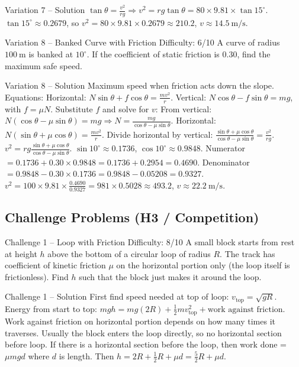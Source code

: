 \documentclass[11pt]{beamer}
\begin{document}
\begin{frame}{Variation 7 – Solution}
$\tan\theta = \frac{v^2}{rg} \Rightarrow v^2 = rg\tan\theta = 80\times9.81\times\tan15^\circ$.
$\tan15^\circ \approx 0.2679$, so $v^2 = 80\times9.81\times0.2679 \approx 210.2$, $v \approx 14.5\ \mathrm{m/s}$.
\end{frame}

\begin{frame}[shrink=15]{Variation 8 – Banked Curve with Friction \hfill Difficulty: 6/10}
A curve of radius $100\ \mathrm{m}$ is banked at $10^\circ$. If the coefficient of static friction is $0.30$, find the maximum safe speed.
\end{frame}

\begin{frame}[shrink=15]{Variation 8 – Solution}
Maximum speed when friction acts down the slope. Equations:
Horizontal: $N\sin\theta + f\cos\theta = \frac{mv^2}{r}$.
Vertical: $N\cos\theta - f\sin\theta = mg$, with $f = \mu N$.
Substitute $f$ and solve for $v$:
From vertical: $N(\cos\theta - \mu\sin\theta) = mg \Rightarrow N = \frac{mg}{\cos\theta - \mu\sin\theta}$.
Horizontal: $N(\sin\theta + \mu\cos\theta) = \frac{mv^2}{r}$.
Divide horizontal by vertical: $\frac{\sin\theta + \mu\cos\theta}{\cos\theta - \mu\sin\theta} = \frac{v^2}{rg}$.
$v^2 = rg \frac{\sin\theta + \mu\cos\theta}{\cos\theta - \mu\sin\theta}$.
$\sin10^\circ \approx 0.1736$, $\cos10^\circ \approx 0.9848$.
Numerator $= 0.1736 + 0.30\times0.9848 = 0.1736 + 0.2954 = 0.4690$.
Denominator $= 0.9848 - 0.30\times0.1736 = 0.9848 - 0.05208 = 0.9327$.
$v^2 = 100\times9.81\times\frac{0.4690}{0.9327} = 981\times0.5028 \approx 493.2$, $v \approx 22.2\ \mathrm{m/s}$.
\end{frame}

\subsection{Challenge Problems (H3 / Competition)}

\begin{frame}[shrink=15]{Challenge 1 – Loop with Friction \hfill Difficulty: 8/10}
A small block starts from rest at height $h$ above the bottom of a circular loop of radius $R$. The track has coefficient of kinetic friction $\mu$ on the horizontal portion only (the loop itself is frictionless). Find $h$ such that the block just makes it around the loop.
\end{frame}

\begin{frame}{Challenge 1 – Solution}
First find speed needed at top of loop: $v_{\text{top}} = \sqrt{gR}$.
Energy from start to top: $mgh = mg(2R) + \frac12 m v_{\text{top}}^2 + \text{work against friction}$.
Work against friction on horizontal portion depends on how many times it traverses. Usually the block enters the loop directly, so no horizontal section before loop. If there is a horizontal section before the loop, then work done = $\mu mg d$ where $d$ is length. Then $h = 2R + \frac12 R + \mu d = \frac52 R + \mu d$.
\end{frame}
\end{document}
